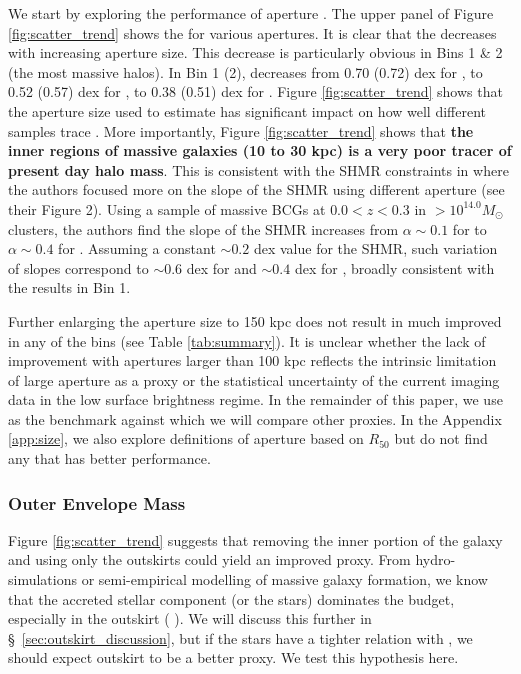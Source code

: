 \documentclass[fleqn,usenatbib,useAMS]{mnras}
\begin{document}
\begin{CJK*}{UTF8}{gbsn}
    We start by exploring the performance of aperture \mstar{}. 
    The upper panel of Figure \ref{fig:scatter_trend} shows the \sigmvir{} for various apertures. 
    It is clear that the \sigmvir{} decreases with increasing aperture size. 
    This decrease is particularly obvious in Bins 1 \& 2 (the most massive halos).
    In Bin 1 (2), \sigmvir{} decreases from 0.70 (0.72) dex for , to 0.52 (0.57) dex for
    , to 0.38 (0.51) dex for . 
    Figure \ref{fig:scatter_trend} shows that the aperture size used to estimate \mstar{} has
    significant impact on how well different samples trace \mvir{}. 
    More importantly, Figure \ref{fig:scatter_trend} shows that \textbf{the inner regions of massive
    galaxies (10 to 30 kpc) is a very poor tracer of present day halo mass}. 
    This is consistent with the SHMR constraints in \citet{GoldenMarx2019} where the authors focused
    more on the slope of the SHMR using different aperture \mstar{} (see their Figure 2).
    Using a sample of massive BCGs at $0.0 < z < 0.3$ in \mvir{}$>10^{14.0} M_{\odot}$ clusters, the
    authors find the slope of the SHMR increases from $\alpha \sim 0.1$ for  to $\alpha
    \sim 0.4$ for .
    Assuming a constant \sigms{}$\sim 0.2$ dex value for the SHMR, such variation of slopes 
    correspond to \sigmvir{}$\sim 0.6$ dex for  and $\sim 0.4$ dex for ,
    broadly consistent with the \topn{} results in Bin 1. 

    Further enlarging the aperture size to 150 kpc does not result in much improved \sigmvir{} in
    any of the bins (see Table \ref{tab:summary}).
    It is unclear whether the lack of improvement with apertures larger than 100 kpc reflects the
    intrinsic limitation of large aperture \mstar{} as a \mvir{} proxy or the statistical
    uncertainty of the current imaging data in the low surface brightness regime. 
    In the remainder of this paper, we use  as the benchmark against which we will
    compare other \mvir{} proxies.
    In the Appendix \ref{app:size}, we also explore definitions of aperture \mstar{} based on
    $R_{50}$ but do not find any that has better performance.
    
\subsubsection{Outer Envelope Mass}
    \label{sec:m100_outskirt}

    Figure \ref{fig:scatter_trend} suggests that removing the inner portion of the galaxy and using
    only the outskirts could yield an improved \mvir{} proxy.
    From hydro-simulations or semi-empirical modelling of massive galaxy formation, we know that the
    accreted stellar component (or the \exsitu{} stars) dominates the \mstar{} budget, especially in
    the outskirt (\eg{} \citealt{RodriguezGomez2016}). 
    We will discuss this further in \S\ \ref{sec:outskirt_discussion}, but if the \exsitu{} stars
    have a tighter relation with \mvir{}, we should expect outskirt \mstar{} to be a better \mvir{}
    proxy. We test this hypothesis here.  


\end{CJK*}
\end{document}
